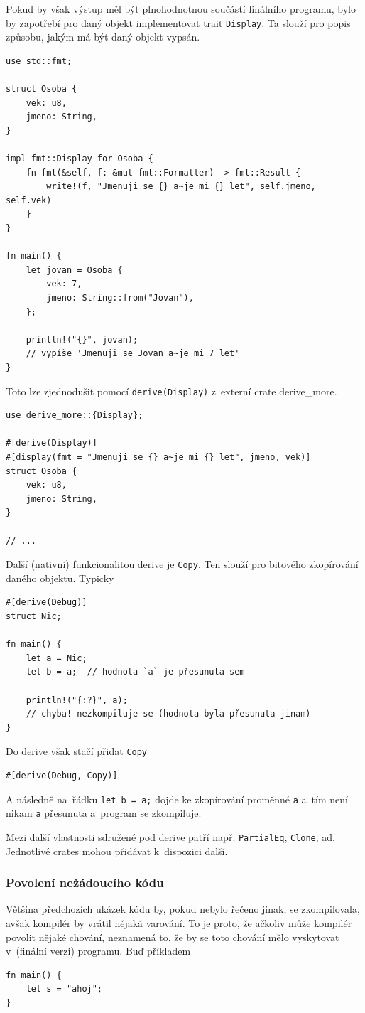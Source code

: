 \documentclass[a4paper, 12pt]{article} %
\newcommand{\rust}[1]{\texttt{#1}}
\begin{document}
			Pokud by však výstup měl být plnohodnotnou součástí finálního programu, bylo by zapotřebí pro daný objekt implementovat trait \rust{Display}. Ta slouží pro popis způsobu, jakým má být daný objekt vypsán.
			\begin{verbatim}
use std::fmt;

struct Osoba {
	vek: u8,
	jmeno: String,
}

impl fmt::Display for Osoba {
	fn fmt(&self, f: &mut fmt::Formatter) -> fmt::Result {
		write!(f, "Jmenuji se {} a~je mi {} let", self.jmeno, self.vek)
	}
}

fn main() {
	let jovan = Osoba {
		vek: 7,
		jmeno: String::from("Jovan"),
	};
	
	println!("{}", jovan);
	// vypíše 'Jmenuji se Jovan a~je mi 7 let'
}
			\end{verbatim}
			
			Toto lze zjednodušit pomocí \texttt{derive(Display)} z~externí crate derive\_more.
			\begin{verbatim}
use derive_more::{Display};

#[derive(Display)]
#[display(fmt = "Jmenuji se {} a~je mi {} let", jmeno, vek)]
struct Osoba {
	vek: u8,
	jmeno: String,
}

// ...
			\end{verbatim}

			Další (nativní) funkcionalitou derive je \rust{Copy}. Ten slouží pro bitového zkopírování daného objektu. Typicky
			\begin{verbatim}
#[derive(Debug)]
struct Nic;

fn main() {
	let a = Nic;
	let b = a;  // hodnota `a` je přesunuta sem
	
	println!("{:?}", a);
	// chyba! nezkompiluje se (hodnota byla přesunuta jinam)
}
				\end{verbatim}
			
				Do derive však stačí přidat \rust{Copy}
				\begin{verbatim}
#[derive(Debug, Copy)]
				\end{verbatim}
			
				A následně na~řádku \rust{let b = a;} dojde ke zkopírování proměnné \rust{a} a~tím není nikam \texttt{a} přesunuta a~program se zkompiluje.

				Mezi další vlastnosti sdružené pod derive patří např. \rust{PartialEq}, \rust{Clone}, ad. Jednotlivé crates mohou přidávat k~dispozici další.


		\subsubsection*{Povolení nežádoucího kódu}
			Většina předchozích ukázek kódu by, pokud nebylo řečeno jinak, se zkompilovala, avšak kompilér by vrátil nějaká varování. To je proto, že ačkoliv může kompilér povolit nějaké chování, neznamená to, že by se toto chování mělo vyskytovat v~(finální verzi) programu. Buď příkladem
			\begin{verbatim}
fn main() {
	let s = "ahoj";
}
			\end{verbatim}
			
\end{document}
